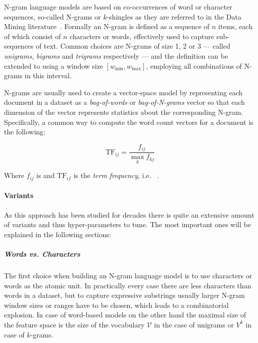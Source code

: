 N-gram language models are based on co-occurrences of word or character sequences, so-called N-grams or $k$-shingles as they are referred to in the Data Mining literature~\cite[Chapter 3.2, p.~72]{Leskovec:2014aa}. Formally an N-gram is defined as a sequence of $n$ items, each of which consist of $n$ characters or words, effectively used to capture sub-sequences of text. Common choices are N-grams of size 1, 2 or 3 --- called \emph{unigrams}, \emph{bigrams} and \emph{trigrams} respectively --- and the definition can be extended to using a window size $[\textit{w}_{\text{min}}, \textit{w}_{\text{max}}]$, employing all combinations of N-grams in this interval.

N-grams are usually used to create a vector-space model by representing each document in a dataset as a \textit{bag-of-words} or \textit{bag-of-N-grams} vector so that each dimension of the vector represents statistics about the corresponding N-gram. Specifically, a common way to compute the word count vectors for a document is the following:

\begin{equation}
  \text{TF}_{ij} = \frac{f_{ij}}{\max_k f_{kj}}
\end{equation}

Where $f_{ij}$ is  and $\text{TF}_{if}$ is the \emph{term frequency}, i.e.   ~\cite[Chapter 1.3.1, p.~8]{Leskovec:2014aa}.


\paragraph{Variants}

As this approach has been studied for decades  there is quite an extensive amount of variants and thus hyper-parameters to tune. The most important ones will be explained in the following sections:

\subparagraph{Words vs. Characters} The first choice when building an N-gram language model is to use characters or words as the atomic unit. In practically every case there are less characters than words in a dataset, but to capture expressive substrings usually larger N-gram window sizes or ranges have to be chosen, which leads to a combinatorial explosion. In case of word-based models on the other hand the maximal size of the feature space is the size of the vocabulary $\mathcal{V}$ in the case of unigrams or $V^k$ in case of $k$-grams.


